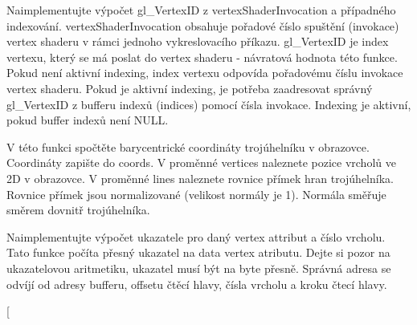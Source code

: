 
\begin{DoxyRefList}
\item[\label{todo__todo000003}%
\hypertarget{todo__todo000003}{}%
Global \hyperlink{group__gpu__side_ga3983ddd2c559c1a6d1e1f1f37be3eae0}{gpu\+\_\+compute\+G\+L\+Vertex\+ID} (Vertex\+Index const $\ast$const indices, Vertex\+Shader\+Invocation const vertex\+Shader\+Invocation)]Naimplementujte výpočet gl\+\_\+\+Vertex\+ID z vertex\+Shader\+Invocation a případného indexování. vertex\+Shader\+Invocation obsahuje pořadové číslo spuštění (invokace) vertex shaderu v rámci jednoho vykreslovacího příkazu. gl\+\_\+\+Vertex\+ID je index vertexu, který se má poslat do vertex shaderu -\/ návratová hodnota této funkce. Pokud není aktivní indexing, index vertexu odpovída pořadovému číslu invokace vertex shaderu. Pokud je aktivní indexing, je potřeba zaadresovat správný gl\+\_\+\+Vertex\+ID z bufferu indexů (indices) pomocí čísla invokace. Indexing je aktivní, pokud buffer indexů není N\+U\+LL.  
\item[\label{todo__todo000007}%
\hypertarget{todo__todo000007}{}%
Global \hyperlink{group__gpu__side_gad1769dca11910a684a6ddaad188f3e3d}{gpu\+\_\+compute\+Screen\+Space\+Barycentrics} (\hyperlink{structVec3}{Vec3} $\ast$const coords, \hyperlink{structVec2}{Vec2} const $\ast$const pixel\+Center, \hyperlink{structVec2}{Vec2} const vertices\mbox{[}V\+E\+R\+T\+I\+C\+E\+S\+\_\+\+P\+E\+R\+\_\+\+T\+R\+I\+A\+N\+G\+LE\mbox{]}, \hyperlink{structVec3}{Vec3} const lines\mbox{[}E\+D\+G\+E\+S\+\_\+\+P\+E\+R\+\_\+\+T\+R\+I\+A\+N\+G\+LE\mbox{]})]V této funkci spočtěte barycentrické coordináty trojúhelníku v obrazovce. Coordináty zapište do coords. V proměnné vertices naleznete pozice vrcholů ve 2D v obrazovce. V proměnné lines naleznete rovnice přímek hran trojúhelníka. Rovnice přímek jsou normalizované (velikost normály je 1). Normála směřuje směrem dovnitř trojúhelníka.  
\item[\label{todo__todo000004}%
\hypertarget{todo__todo000004}{}%
Global \hyperlink{group__gpu__side_ga4b894f26ed3c06346da10fc6c41f90eb}{gpu\+\_\+compute\+Vertex\+Attribute\+Data\+Pointer} (\hyperlink{structGPUVertexPullerHead}{G\+P\+U\+Vertex\+Puller\+Head} const $\ast$const head, Vertex\+Index const gl\+\_\+\+Vertex\+ID)]Naimplementujte výpočet ukazatele pro daný vertex attribut a číslo vrcholu. Tato funkce počíta přesný ukazatel na data vertex atributu. Dejte si pozor na ukazatelovou aritmetiku, ukazatel musí být na byte přesně. Správná adresa se odvíjí od adresy bufferu, offsetu čtěcí hlavy, čísla vrcholu a kroku čtecí hlavy.  
\item[\label{todo__todo000006}%

\end{DoxyRefList}

